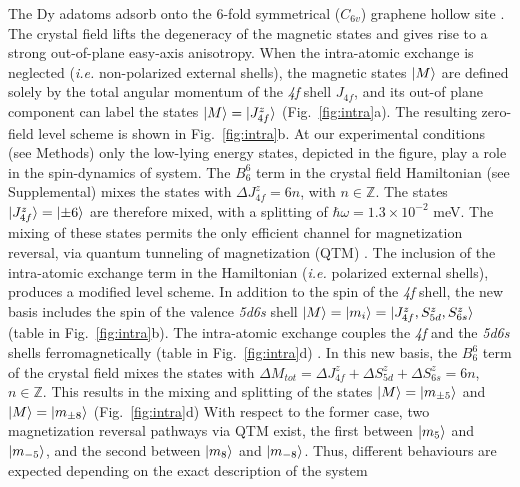 \documentclass[
reprint,amsmath,amssymb,aps]{revtex4-2}
\begin{document}
The Dy adatoms adsorb onto the 6-fold symmetrical ($C_{6v}$) graphene hollow site \cite{baltic2018}. The crystal field lifts the degeneracy of the magnetic states and gives rise to a strong out-of-plane easy-axis anisotropy.
When the intra-atomic exchange is neglected (\textit{i.e.} non-polarized external shells), the magnetic states $\ket{M}$ are defined solely by the total angular momentum of the \textit{4f} shell $J_{4f}$, and its out-of plane component can label the states $\ket{M}=\ket{J^{z}_{4f}}$ (Fig.~\ref{fig:intra}a). The resulting zero-field level scheme is shown in Fig.~\ref{fig:intra}b. At our experimental conditions (see Methods) only the low-lying energy states, depicted in the figure, play a role in the spin-dynamics of system. The $B_6^6$ term in the crystal field Hamiltonian (see Supplemental) mixes the states with $\Delta J^{z}_{4f}=6n$, with $n\in \mathbb{Z}$. The states $\ket{J^{z}_{4f}}=\ket{\pm 6}$ are therefore mixed, with a splitting of $\hbar\omega=1.3 \times 10^{-2}$ meV. The mixing of these states permits the only efficient channel for magnetization reversal, via quantum tunneling of magnetization (QTM) \citep{baltic2016}. The inclusion of the intra-atomic exchange term in the Hamiltonian (\textit{i.e.} polarized external shells), produces a modified level scheme. In addition to the spin of the \textit{4f} shell, the new basis includes the spin of the valence \textit{5d6s} shell $\ket{M}=\ket{m_i}=\ket{J_{4f}^z,S_{5d}^z,S_{6s}^z}$ (table in Fig.~\ref{fig:intra}b). The intra-atomic exchange couples the \textit{4f} and the \textit{5d6s} shells ferromagnetically (table in Fig.~\ref{fig:intra}d) \cite{pivettaMeasuringIntraAtomicExchange2020}. 
In this new basis, the $B_6^6$ term of the crystal field mixes the states with $\Delta M_{tot}=\Delta J_{4f}^z + \Delta S_{5d}^z + \Delta S_{6s}^z=6n$, $n\in \mathbb{Z}$. This results in the mixing and splitting of the states $\ket{M}=\ket{m_{\pm 5}}$ and $\ket{M}=\ket{m_{\pm 8}}$ (Fig.~\ref{fig:intra}d)
With respect to the former case, two magnetization reversal pathways via QTM exist, the first between $\ket{m_{5}}$ and $\ket{m_{-5}}$, and the second between $\ket{m_{8}}$ and $\ket{m_{-8}}$. Thus, different behaviours are expected depending on the exact description of the system
\end{document}

